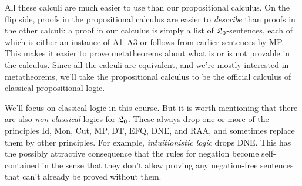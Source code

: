 All these calculi are much easier to use than our propositional calculus.
On the flip side,
proofs in the propositional calculus are easier to \emph{describe} than
proofs in the other calculi:
a proof in our calculus is simply a list of $\mathfrak{L}_{0}$-sentences,
each of which is either an instance of A1--A3 or follows from earlier sentences by MP.
This makes it easier to prove metatheorems about what is or is not provable in the calculus.
Since all the calculi are equivalent,
and we're mostly interested in metatheorems,
we'll take the propositional calculus to be the official calculus of classical propositional logic.

We'll focus on classical logic in this course.
But it is worth mentioning that
there are also \textit{non-classical} logics for $\mathfrak{L}_{0}$.
These always drop one or more of the principles Id, Mon, Cut, MP, DT, EFQ, DNE, and RAA,
and sometimes replace them by other principles.
For example,
\emph{intuitionistic logic} drops DNE.
This has the possibly attractive consequence that
the rules for negation become self-contained in the sense that
they don't allow proving any negation-free sentences
that can't already be proved without them.





